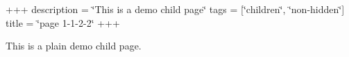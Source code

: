 +++ description = \char`\"{}\+This is a demo child page\char`\"{} tags = \mbox{[}\char`\"{}children\char`\"{}, \char`\"{}non-\/hidden\char`\"{}\mbox{]} title = \char`\"{}page 1-\/1-\/2-\/2\char`\"{} +++

This is a plain demo child page. 